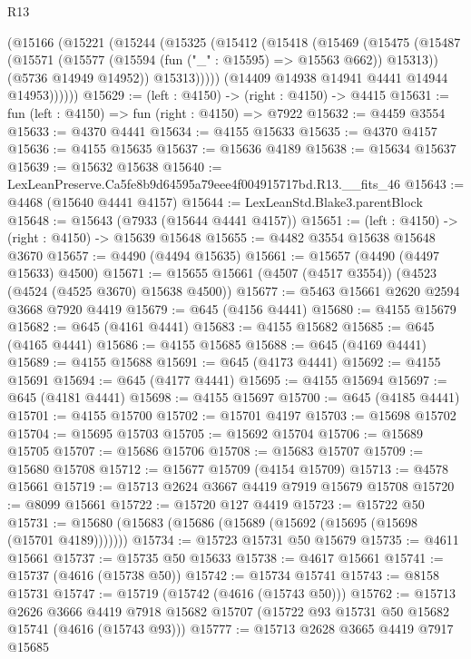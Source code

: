 \begin{lexlean}{R13}
\begin{coremodule}
        (@15166
          (@15221
            (@15244
              (@15325
                (@15412
                  (@15418
                    (@15469
                      (@15475
                        (@15487
                          (@15571 (@15577 (@15594 (fun ("_" : @15595) => @15563 @662)) @15313))
                          (@5736 @14949 @14952))
                        @15313)))))
              (@14409 @14938 @14941 @4441 @14944 @14953))))))
@15629 := (left : @4150) -> (right : @4150) -> @4415
@15631 := fun (left : @4150) => fun (right : @4150) => @7922
@15632 := @4459 @3554
@15633 := @4370 @4441
@15634 := @4155 @15633
@15635 := @4370 @4157
@15636 := @4155 @15635
@15637 := @15636 @4189
@15638 := @15634 @15637
@15639 := @15632 @15638
@15640 := LexLeanPreserve.Ca5fe8b9d64595a79eee4f004915717bd.R13.__fits_46
@15643 := @4468 (@15640 @4441 @4157)
@15644 := LexLeanStd.Blake3.parentBlock
@15648 := @15643 (@7933 (@15644 @4441 @4157))
@15651 := (left : @4150) -> (right : @4150) -> @15639 @15648
@15655 := @4482 @3554 @15638 @15648 @3670
@15657 := @4490 (@4494 @15635)
@15661 := @15657 (@4490 (@4497 @15633) @4500)
@15671 := @15655 @15661 (@4507 (@4517 @3554)) (@4523 (@4524 (@4525 @3670) @15638 @4500))
@15677 := @5463 @15661 @2620 @2594 @3668 @7920 @4419
@15679 := @645 (@4156 @4441)
@15680 := @4155 @15679
@15682 := @645 (@4161 @4441)
@15683 := @4155 @15682
@15685 := @645 (@4165 @4441)
@15686 := @4155 @15685
@15688 := @645 (@4169 @4441)
@15689 := @4155 @15688
@15691 := @645 (@4173 @4441)
@15692 := @4155 @15691
@15694 := @645 (@4177 @4441)
@15695 := @4155 @15694
@15697 := @645 (@4181 @4441)
@15698 := @4155 @15697
@15700 := @645 (@4185 @4441)
@15701 := @4155 @15700
@15702 := @15701 @4197
@15703 := @15698 @15702
@15704 := @15695 @15703
@15705 := @15692 @15704
@15706 := @15689 @15705
@15707 := @15686 @15706
@15708 := @15683 @15707
@15709 := @15680 @15708
@15712 := @15677 @15709 (@4154 @15709)
@15713 := @4578 @15661
@15719 := @15713 @2624 @3667 @4419 @7919 @15679 @15708
@15720 := @8099 @15661
@15722 := @15720 @127 @4419
@15723 := @15722 @50
@15731 := @15680 (@15683 (@15686 (@15689 (@15692 (@15695 (@15698 (@15701 @4189)))))))
@15734 := @15723 @15731 @50 @15679
@15735 := @4611 @15661
@15737 := @15735 @50 @15633
@15738 := @4617 @15661
@15741 := @15737 (@4616 (@15738 @50))
@15742 := @15734 @15741
@15743 := @8158 @15731
@15747 := @15719 (@15742 (@4616 (@15743 @50)))
@15762 := @15713
    @2626
    @3666
    @4419
    @7918
    @15682
    @15707
    (@15722 @93 @15731 @50 @15682 @15741 (@4616 (@15743 @93)))
@15777 := @15713
    @2628
    @3665
    @4419
    @7917
    @15685

\end{coremodule}
\end{lexlean}
